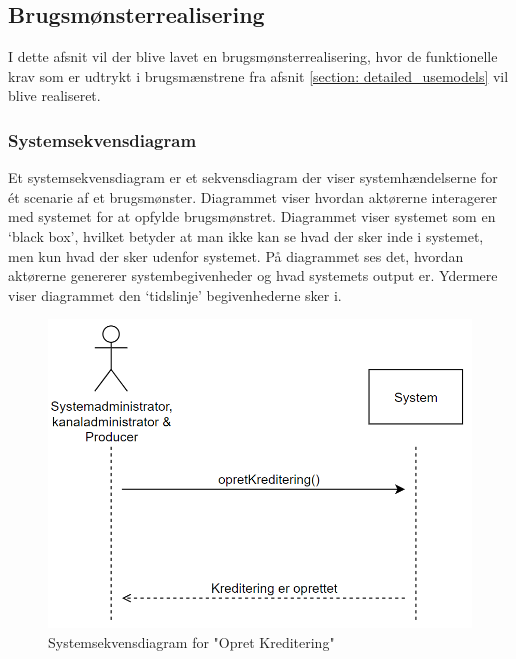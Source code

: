\subsection{Brugsmønsterrealisering}
I dette afsnit vil der blive lavet en brugsmønsterrealisering, hvor de funktionelle krav som er udtrykt i brugsmænstrene fra afsnit \ref{section: detailed_usemodels} vil blive realiseret.

\subsubsection{Systemsekvensdiagram}
Et systemsekvensdiagram er et sekvensdiagram der viser systemhændelserne for ét scenarie af et brugsmønster. Diagrammet viser hvordan aktørerne interagerer med systemet for at opfylde brugsmønstret. Diagrammet viser systemet som en ‘black box’, hvilket betyder at man ikke kan se hvad der sker inde i systemet, men kun hvad der sker udenfor systemet. På diagrammet ses det, hvordan aktørerne genererer systembegivenheder og hvad systemets output er. Ydermere viser diagrammet den ‘tidslinje’ begivenhederne sker i. \\

\begin{figure}[ht]
    \centering
    \includegraphics[scale=0.45]{figures/systemsekvensdiagrammer/opretKreditering.PNG}
    \caption{Systemsekvensdiagram for "Opret Kreditering"}
    \label{fig:systemsekvensdiagram_opretKreditering}
\end{figure}

